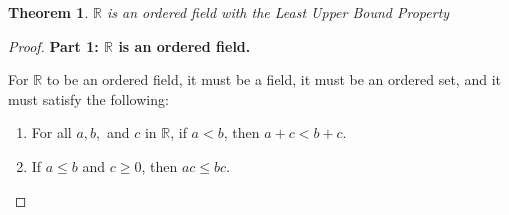 \documentclass[11pt]{article}
\newtheorem*{theorem}{Theorem}
\begin{document}
\begin{theorem}
    $\mathbb{R}$ is an ordered field with the Least Upper Bound Property
\end{theorem}
\begin{proof}
    \textbf{Part 1: $\mathbb{R}$ is an ordered field.}
    
    For $\mathbb{R}$ to be an ordered field, it must be a field, it must be an ordered set, and it must satisfy the following:
    \begin{enumerate}[label=(\roman*)]
        \item   For all $a, b,$ and $c$ in $\mathbb{R}$, if $a < b$, then $a + c < b + c$.
        \item   If $a \leq b$ and $c \geq 0$, then $ac \leq bc$.
    \end{enumerate}


\end{proof}
\end{document}

